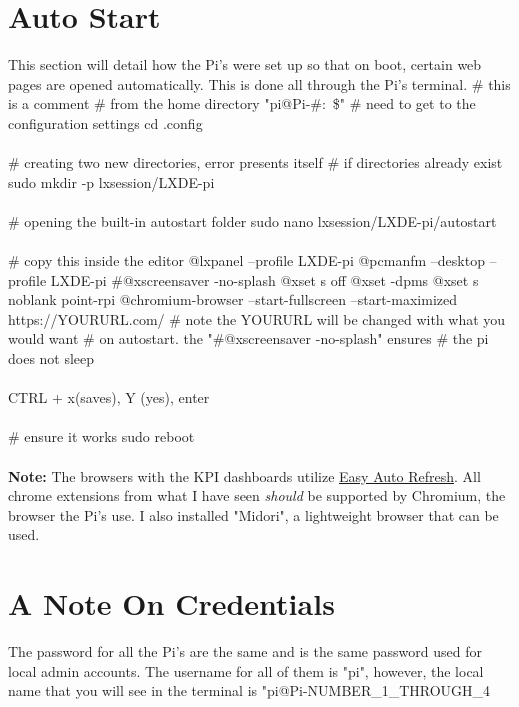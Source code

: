 \documentclass[12pt]{extarticle}
\begin{document}
\section{Auto Start}
This section will detail how the Pi's were set up so that on boot, certain web pages are opened automatically. This is done all through the Pi's terminal. \newline \newline
{\selectfont
\# this is a comment \newline \newline
\# from the home directory "pi@Pi-\#:~\$" \newline
\# need to get to the configuration settings \newline
cd .config \\~\\
\# creating two new directories, error presents itself \newline \# if directories already exist \newline
sudo mkdir -p lxsession/LXDE-pi \\~\\
\# opening the built-in autostart folder \newline
sudo nano lxsession/LXDE-pi/autostart \\~\\
\# copy this inside the editor \newline
@lxpanel --profile LXDE-pi
@pcmanfm --desktop --profile LXDE-pi
#@xscreensaver -no-splash
@xset s off
@xset -dpms
@xset s noblank
point-rpi
@chromium-browser --start-fullscreen --start-maximized https://YOURURL.com/ \newline
\# note the YOURURL will be changed with what you would want \newlineo
\# on autostart. the "#@xscreensaver -no-splash" ensures \newline \# the pi does not sleep \\~\\
CTRL + x(saves), Y (yes), enter \\~\\
\# ensure it works \newline
sudo reboot
}
\\~\\
\textbf{Note: }The browsers with the KPI dashboards utilize \href{https://chrome.google.com/webstore/detail/easy-auto-refresh/aabcgdmkeabbnleenpncegpcngjpnjkc?hl=en}{Easy Auto Refresh}. All chrome extensions from what I have seen \emph{should} be supported by Chromium, the browser the Pi's use. I also installed "Midori", a lightweight browser that can be used.
\newpage
\section{A Note On Credentials}
The password for all the Pi's are the same and is the same password used for local admin accounts. The username for all of them is "pi", however, the local name that you will see in the terminal is "pi@Pi-NUMBER\_1\_THROUGH\_4
\end{document}
